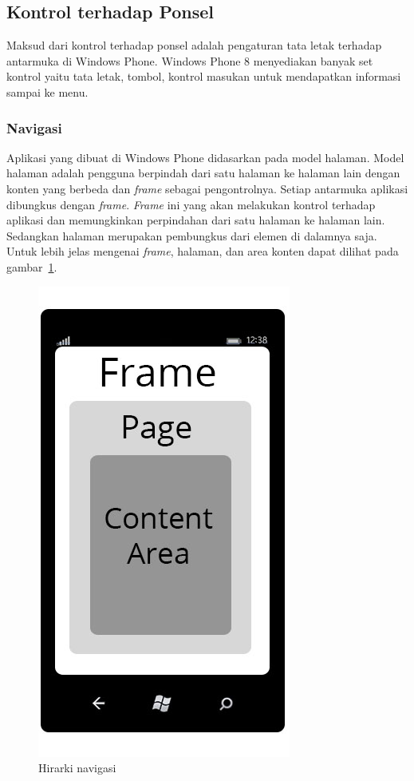 \subsection{Kontrol terhadap Ponsel}
\label{subsec:Kontrol terhadap Ponsel}
\hspace{0.5cm} Maksud dari kontrol terhadap ponsel adalah pengaturan tata letak terhadap antarmuka di Windows Phone\cite{MSDN}. Windows Phone 8 menyediakan banyak set kontrol yaitu tata letak, tombol, kontrol masukan untuk mendapatkan informasi sampai ke menu. 

\subsubsection{Navigasi}
\label{subsubsec:Navigasi}
\hspace{0.5cm} Aplikasi yang dibuat di Windows Phone didasarkan pada model halaman. Model halaman adalah pengguna berpindah dari satu halaman ke halaman lain dengan konten yang berbeda dan \textit{frame} sebagai pengontrolnya. Setiap antarmuka aplikasi dibungkus dengan \textit{frame}. \textit{Frame} ini yang akan melakukan kontrol terhadap aplikasi dan memungkinkan perpindahan dari satu halaman ke halaman lain. Sedangkan halaman merupakan pembungkus dari elemen di dalamnya saja. Untuk lebih jelas mengenai \textit{frame}, halaman, dan area konten dapat dilihat pada gambar~\ref{fig:nav_hierarchy}.

\begin{figure}[h]
	\centering
		\includegraphics[scale=0.5]{Gambar/nav_hierarchy}
	\caption{Hirarki navigasi}
	\label{fig:nav_hierarchy}
\end{figure}


